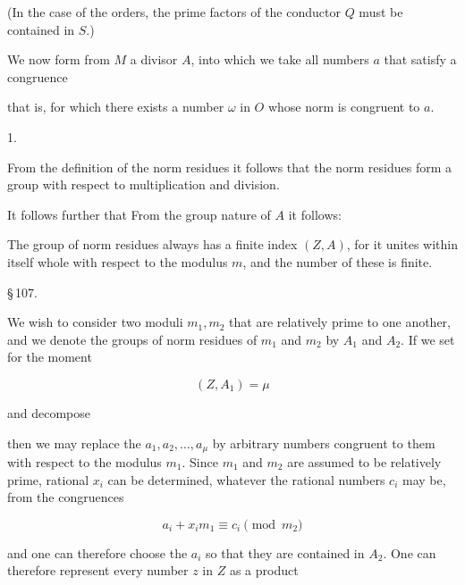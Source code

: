  (In the case of the orders, the prime factors of the conductor $Q$ must be contained in $S$.)

We now form from $M$ a divisor $A$, into which we take all numbers $a$ that satisfy a congruence


that is, for which there exists a number $\omega$ in $O$ whose norm is congruent to $a$.

1. 

From the definition of the norm residues it follows that the norm residues form a group with respect to multiplication and division.

It follows further that  From the group nature of $A$ it follows:



The group of norm residues always has a finite index $(Z, A)$, for it unites within itself whole  with respect to the modulus $m$, and the number of these is finite.

\S\,107. 

We wish to consider two moduli $m_1, m_2$ that are relatively prime to one another, and we denote the groups of norm residues of $m_1$ and $m_2$ by $A_1$ and $A_2$. If we set for the moment

\[ (Z, A_1) = \mu \]

and decompose


then we may replace the $a_1, a_2, \ldots, a_\mu$ by arbitrary numbers congruent to them with respect to the modulus $m_1$. Since $m_1$ and $m_2$ are assumed to be relatively prime, rational $x_i$ can be determined, whatever the rational numbers $c_i$ may be, from the congruences

\[ a_i + x_i m_1 \equiv c_i \pmod{m_2} \]

and one can therefore choose the $a_i$ so that they are contained in $A_2$. One can therefore represent every number $z$ in $Z$ as a product
